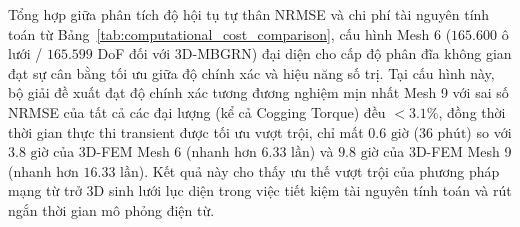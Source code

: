 Tổng hợp giữa phân tích độ hội tụ tự thân NRMSE và chi phí tài nguyên tính toán từ Bảng~\ref{tab:computational_cost_comparison}, cấu hình Mesh 6 ($165.600$ ô lưới / $165.599$ DoF đối với 3D-MBGRN) đại diện cho cấp độ phân đĩa không gian đạt sự cân bằng tối ưu giữa độ chính xác và hiệu năng số trị. Tại cấu hình này, bộ giải đề xuất đạt độ chính xác tương đương nghiệm mịn nhất Mesh 9 với sai số NRMSE của tất cả các đại lượng (kể cả Cogging Torque) đều $< 3.1\%$, đồng thời thời gian thực thi transient được tối ưu vượt trội, chỉ mất $0.6\text{ giờ}$ ($36\text{ phút}$) so với $3.8\text{ giờ}$ của 3D-FEM Mesh 6 (nhanh hơn $6.33\text{ lần}$) và $9.8\text{ giờ}$ của 3D-FEM Mesh 9 (nhanh hơn $16.33\text{ lần}$). Kết quả này cho thấy ưu thế vượt trội của phương pháp mạng từ trở 3D sinh lưới lục diện trong việc tiết kiệm tài nguyên tính toán và rút ngắn thời gian mô phỏng điện từ.